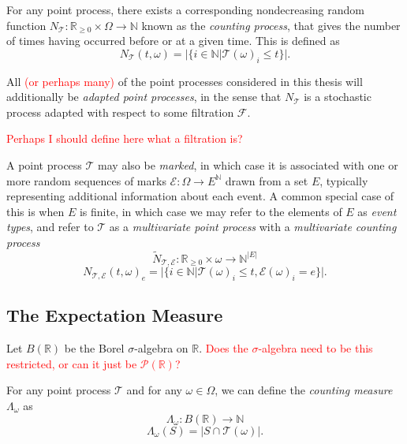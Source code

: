 \documentclass[honours,12pt]{unswthesis}
\numberwithin{equation}{section}
\begin{document}
{\noindent}For any point process, there exists a corresponding nondecreasing random function $N_{\mathcal T}:\mathbb{R}_{\geq 0}\times\Omega\to\mathbb{N}$ known as the \textit{counting process}, that gives the number of times having occurred before or at a given time. This is defined as
$$N_{\mathcal T}(t,\omega) = \vert \{i\in\mathbb N \vert \mathcal{T}(\omega)_i \leq t\} \vert.$$

{\noindent}All \textcolor{red}{(or perhaps many)} of the point processes considered in this thesis will additionally be \textit{adapted point processes}, in the sense that $N_{\mathcal T}$ is a stochastic process adapted with respect to some filtration $\mathcal F$.

\textcolor{red}{Perhaps I should define here what a filtration is?}

{\noindent}A point process $\mathcal T$ may also be \textit{marked}, in which case it is associated with one or more random sequences of marks $\mathcal E:\Omega\to E^{\mathbb N}$ drawn from a set $E$, typically representing additional information about each event. A common special case of this is when $E$ is finite, in which case we may refer to the elements of $E$ as \textit{event types}, and refer to $\mathcal T$ as a \textit{multivariate point process} with a \textit{multivariate counting process}
$${\tilde N}_{\mathcal T, \mathcal E} : \mathbb{R}_{\geq 0}\times\omega \to \mathbb N ^ {\vert E \vert}$$
$$N_{\mathcal T, \mathcal E}(t,\omega)_e = \vert \{i\in\mathbb N \vert \mathcal{T}(\omega)_i \leq t, \mathcal{E}(\omega)_i=e\} \vert.$$


\subsection{The Expectation Measure}
Let $B(\mathbb{R})$ be the Borel $\sigma$-algebra on $\mathbb R$.
\textcolor{red}{Does the $\sigma$-algebra need to be this restricted, or can it just be $\mathcal{P}(\mathbb{R})$?}

{\noindent}For any point process $\mathcal T$ and for any $\omega\in\Omega$, we can define the \textit{counting measure} $\Lambda_\omega$ as
$$\Lambda_\omega : B(\mathbb R) \to \mathbb{N}$$
$$\Lambda_\omega(S) = \left\vert S\cap \mathcal{T}(\omega)\right\vert.$$
\end{document}
